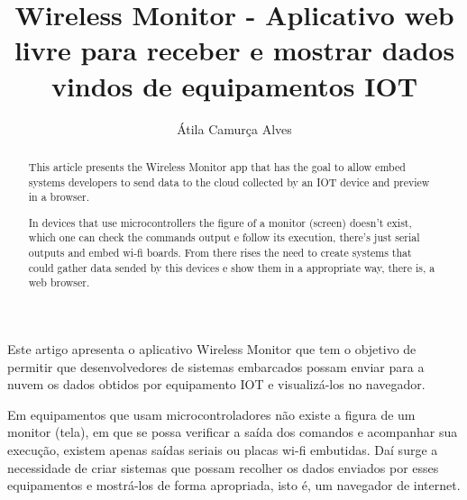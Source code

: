 \documentclass[a4paper,12pt]{article}
\title{Wireless Monitor - Aplicativo web livre para receber e mostrar dados vindos de equipamentos IOT}
\author{Átila Camurça Alves\inst{1}}
\newcommand{\wm}{Wireless Monitor\xspace}
\begin{document}
\maketitle

\begin{abstract}
This article presents the \wm app that has the goal to allow
embed systems developers to send data to the cloud collected by
an IOT device and preview in a browser.

In devices that use microcontrollers the figure of a monitor (screen)
doesn't exist, which one can check the commands output e follow
its execution, there's just serial outputs and embed wi-fi boards.
From there rises the need to create systems that could gather data
sended by this devices e show them in a appropriate way, there is,
a web browser.
\end{abstract}
     
\begin{resumo}
Este artigo apresenta o aplicativo \wm que tem o objetivo de permitir que
desenvolvedores de sistemas embarcados possam enviar para a nuvem
os dados obtidos por equipamento IOT e visualizá-los no navegador.

Em equipamentos que usam microcontroladores não existe a figura de
um monitor (tela), em que se possa verificar a saída dos comandos e acompanhar
sua execução, existem apenas saídas seriais ou placas wi-fi embutidas.
Daí surge a necessidade de criar sistemas que possam recolher os dados
enviados por esses equipamentos e mostrá-los de forma apropriada, isto é,
um navegador de internet.
\end{resumo}





\end{document}
